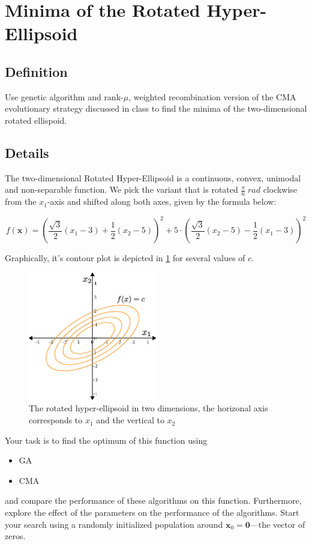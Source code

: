 \documentclass[11pt]{article}
\begin{document}
\section{Minima of the Rotated Hyper-Ellipsoid}
\label{sec:orgef47b04}
\subsection{Definition}
\label{sec:org27e7c02}
  Use genetic algorithm and rank-\(\mu\), weighted recombination version of the CMA
evolutionary strategy discussed in class to find the minima of the
two-dimensional rotated ellispoid.
\subsection{Details}
\label{sec:org70431d1}
The two-dimensional Rotated Hyper-Ellipsoid is a continuous, convex, unimodal
and non-separable function. We pick the variant that is rotated \(\frac{\pi}{6} \; \si{rad}\) clockwise from the \(x_1\)-axis and shifted along
both axes, given by the formula below:

\begin{equation}
f(\mathbf{x}) = \left( \dfrac{\sqrt{3}}{2} (x_1 - 3) + \dfrac{1}{2} (x_2 - 5) \right)^2 + 5 \cdot \left(  \dfrac{\sqrt{3}}{2} (x_2 - 5) - \dfrac{1}{2} (x_1 - 3)  \right)^2
\end{equation}


Graphically, it's contour plot is depicted in \cref{ellipsoid} for several
  values of \(c\).
\begin{figure}[htbp]
\centering
\includegraphics[width=0.5\textwidth]{images/ellipsoid.eps}
\caption{\label{ellipsoid}
The rotated hyper-ellipsoid in two dimensions, the horizonal axis corresponds to \(x_1\) and the vertical to \(x_2\)}
\end{figure}

Your task is to find the optimum of this function using
\begin{itemize}
\item GA
\item CMA
\end{itemize}
and compare the performance of these algorithms on this function. Furthermore,
explore the effect of the parameters on the performance of the algorithms.
Start your search using a randomly initialized population around \(\mathbf{x}_0 = \mathbf{0}\)---the vector of zeros.
\end{document}
